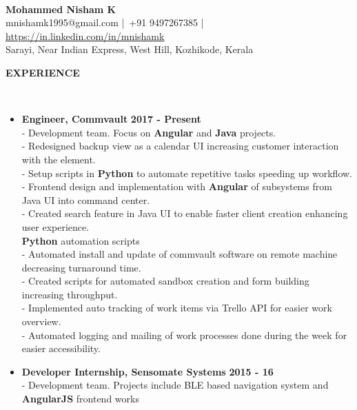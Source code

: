 \documentclass[a4paper,10pt]{article}
\newcommand{\lsep}{-0.5cm}
\newcommand{\resheading}[1]{{\small \colorbox{mygrey}{\begin{minipage}{0.975\textwidth}{\textbf{\uppercase{#1} \vphantom{p\^{E}}}}\end{minipage}}}}
\newcommand{\when}[1]{\hfill \textbf{#1}}
\newenvironment{noSepItemize}
{ \begin{itemize}
    \setlength{\itemsep}{1pt}
    \setlength{\parskip}{0pt}
    \setlength{\parsep}{0pt}     }
{ \end{itemize}                  }
\begin{document}
\hspace{0.5cm}\\[-0.2cm]

\begin{center}
\textbf{\Large{Mohammed Nisham K}} \\
mnishamk1995@gmail.com |\, +91 9497267385 |\, \href{https://in.linkedin.com/in/mnishamk}{https://in.linkedin.com/in/mnishamk}\\
Sarayi, Near Indian Express, West Hill, Kozhikode, Kerala \\
\end{center}

\resheading{\textbf{Experience} }\\[\lsep]
\begin{noSepItemize}
\item \noindent \textbf{Engineer, Commvault} \when{2017 - Present}
	\\ \indent - Development team. Focus on \textbf{Angular} and \textbf{Java} projects.
	\\ \indent - Redesigned backup view as a calendar UI increasing customer interaction with the element.
	\\ \indent - Setup scripts in \textbf{Python} to automate repetitive tasks speeding up workflow.
	\\ \indent - Frontend design and implementation with \textbf{Angular} of subsystems from Java UI into command center.
	\\ \indent - Created search feature in Java UI to enable faster client creation enhancing user experience. 
	\\ \indent \textbf{Python} automation scripts
	\\ \indent \indent - Automated install and update of commvault software on remote machine decreasing turnaround time. 
	\\ \indent \indent - Created scripts for automated sandbox creation and form building increasing throughput.
	\\ \indent \indent - Implemented auto tracking of work items via Trello API for easier work overview.
	\\ \indent \indent - Automated logging and mailing of work processes done during the week for easier accessibility.
	\item \noindent \textbf{Developer Internship, Sensomate Systems} \when{2015 - 16}\\
	\indent - Development team. Projects include BLE based navigation system and \textbf{AngularJS} frontend works
\end{noSepItemize}
\end{document}
